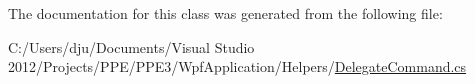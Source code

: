 The documentation for this class was generated from the following file\-:\begin{DoxyCompactItemize}
\item 
C\-:/\-Users/dju/\-Documents/\-Visual Studio 2012/\-Projects/\-P\-P\-E/\-P\-P\-E3/\-Wpf\-Application/\-Helpers/\hyperlink{_delegate_command_8cs}{Delegate\-Command.\-cs}\end{DoxyCompactItemize}
